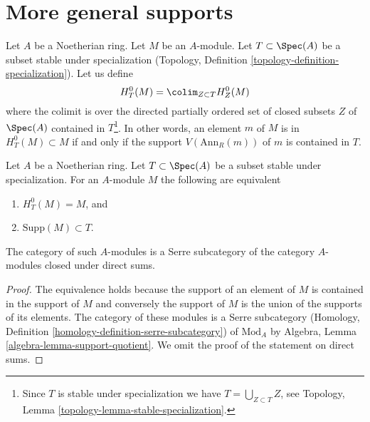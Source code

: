 \section{More general supports}
\label{section-supports}

\noindent
Let $A$ be a Noetherian ring. Let $M$ be an $A$-module.
Let $T \subset \Spec(A)$ be a subset stable under specialization
(Topology, Definition \ref{topology-definition-specialization}).
Let us define
$$
H^0_T(M) = \colim_{Z \subset T} H^0_Z(M)
$$
where the colimit is over the directed partially ordered set of
closed subsets $Z$ of $\Spec(A)$ contained in
$T$\footnote{Since $T$ is stable under specialization
we have $T = \bigcup_{Z \subset T} Z$, see
Topology, Lemma \ref{topology-lemma-stable-specialization}.}.
In other words, an element $m$ of $M$ is in $H^0_T(M) \subset M$
if and only if the support $V(\text{Ann}_R(m))$ of $m$
is contained in $T$.

\begin{lemma}
\label{lemma-support}
Let $A$ be a Noetherian ring. Let $T \subset \Spec(A)$ be a subset stable
under specialization. For an $A$-module $M$ the following are equivalent
\begin{enumerate}
\item $H^0_T(M) = M$, and
\item $\text{Supp}(M) \subset T$.
\end{enumerate}
The category of such $A$-modules is a Serre subcategory
of the category $A$-modules closed under direct sums.
\end{lemma}

\begin{proof}
The equivalence holds because the support of an element of $M$
is contained in the support of $M$ and conversely the support of
$M$ is the union of the supports of its elements.
The category of these modules is a Serre subcategory
(Homology, Definition \ref{homology-definition-serre-subcategory})
of $\text{Mod}_A$ by
Algebra, Lemma \ref{algebra-lemma-support-quotient}.
We omit the proof of the statement on direct sums.
\end{proof}

